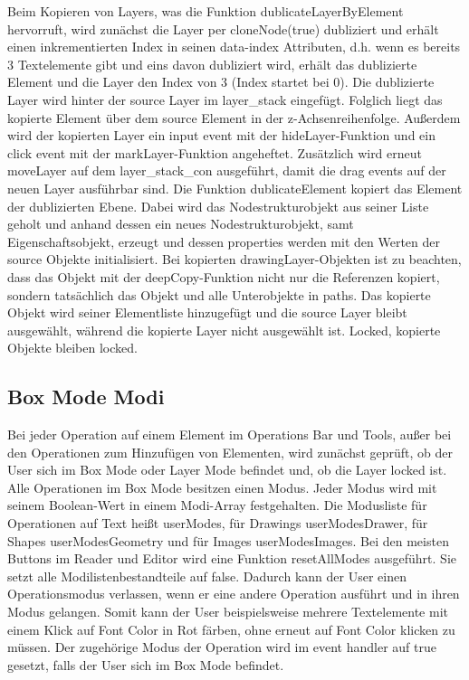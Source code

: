 Beim Kopieren von Layers, was die Funktion dublicateLayerByElement hervorruft, wird zunächst die Layer per cloneNode(true) dubliziert und erhält einen inkrementierten Index in seinen data-index Attributen, d.h. wenn es bereits 3 Textelemente gibt und eins davon dubliziert wird, erhält das dublizierte Element und die Layer den Index von 3 (Index startet bei 0). Die dublizierte Layer wird hinter der source Layer im layer\_stack eingefügt. Folglich liegt das kopierte Element über dem source Element in der z-Achsenreihenfolge. Außerdem wird der kopierten Layer ein input event mit der hideLayer-Funktion und ein click event mit der markLayer-Funktion angeheftet. Zusätzlich wird erneut moveLayer auf dem layer\_stack\_con ausgeführt, damit die drag events auf der neuen Layer ausführbar sind. Die Funktion dublicateElement kopiert das Element der dublizierten Ebene. Dabei wird das Nodestrukturobjekt aus seiner Liste geholt und anhand dessen ein neues Nodestrukturobjekt, samt Eigenschaftsobjekt, erzeugt und dessen properties werden mit den Werten der source Objekte initialisiert. Bei kopierten drawingLayer-Objekten ist zu beachten, dass das Objekt mit der deepCopy-Funktion nicht nur die Referenzen kopiert, sondern tatsächlich das Objekt und alle Unterobjekte in paths. Das kopierte Objekt wird seiner Elementliste hinzugefügt und die source Layer bleibt ausgewählt, während die kopierte Layer nicht ausgewählt ist. Locked, kopierte Objekte bleiben locked.

\subsection{Box Mode Modi}
Bei jeder Operation auf einem Element im Operations Bar und Tools, außer bei den Operationen zum Hinzufügen von Elementen, wird zunächst geprüft, ob der User sich im Box Mode oder Layer Mode befindet und, ob die Layer locked ist. Alle Operationen im Box Mode besitzen einen Modus. Jeder Modus wird mit seinem Boolean-Wert in einem Modi-Array festgehalten. Die Modusliste für Operationen auf Text heißt userModes, für Drawings userModesDrawer, für Shapes userModesGeometry und für Images userModesImages. Bei den meisten Buttons im Reader und Editor wird eine Funktion resetAllModes ausgeführt. Sie setzt alle Modilistenbestandteile auf false. Dadurch kann der User einen Operationsmodus verlassen, wenn er eine andere Operation ausführt und in ihren Modus gelangen. Somit kann der User beispielsweise mehrere Textelemente mit einem Klick auf Font Color in Rot färben, ohne erneut auf Font Color klicken zu müssen. Der zugehörige Modus der Operation wird im event handler auf true gesetzt, falls der User sich im Box Mode befindet.

